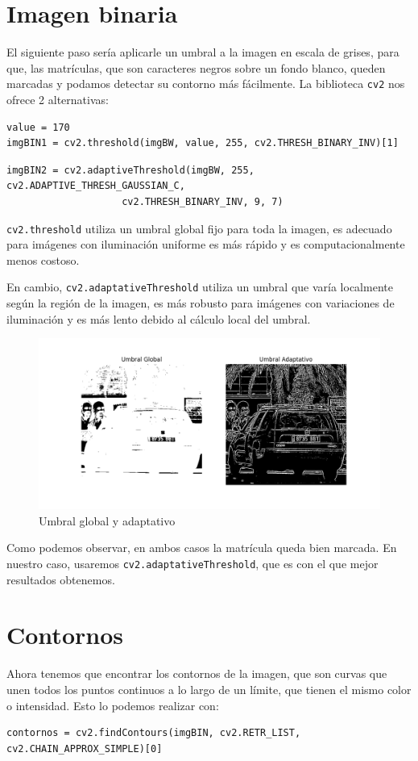 \section{Imagen binaria}
El siguiente paso sería aplicarle un umbral a la imagen en escala de grises, para que, las matrículas, que son caracteres negros sobre un fondo blanco, queden marcadas y podamos detectar su contorno más fácilmente. La biblioteca \texttt{cv2} nos ofrece 2 alternativas:
\begin{verbatim}
value = 170
imgBIN1 = cv2.threshold(imgBW, value, 255, cv2.THRESH_BINARY_INV)[1]
\end{verbatim}
\begin{verbatim}
imgBIN2 = cv2.adaptiveThreshold(imgBW, 255, cv2.ADAPTIVE_THRESH_GAUSSIAN_C, 
                    cv2.THRESH_BINARY_INV, 9, 7)
\end{verbatim}

\texttt{cv2.threshold} utiliza un umbral global fijo para toda la imagen, es adecuado para imágenes con iluminación uniforme es más rápido y es computacionalmente menos costoso.

En cambio, \texttt{cv2.adaptativeThreshold} utiliza un umbral que varía localmente según la región de la imagen, es más robusto para imágenes con variaciones de iluminación y es más lento debido al cálculo local del umbral.

\begin{figure}[H]
    \centering
    \includegraphics[width=.8\linewidth]{Images/coche1Umbrealizaciones.png}
    \caption{Umbral global y adaptativo}
    \label{coche1Umbrealizaciones}
\end{figure}

Como podemos observar, en ambos casos la matrícula queda bien marcada. En nuestro caso, usaremos \texttt{cv2.adaptativeThreshold}, que es con el que mejor resultados obtenemos.

\section{Contornos}
Ahora tenemos que encontrar los contornos de la imagen, que son curvas que unen todos los puntos continuos a lo largo de un límite, que tienen el mismo color o intensidad. Esto lo podemos realizar con:
\begin{verbatim}
contornos = cv2.findContours(imgBIN, cv2.RETR_LIST, cv2.CHAIN_APPROX_SIMPLE)[0]
\end{verbatim}

